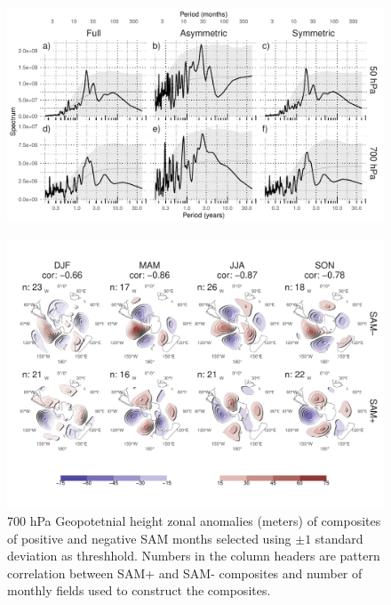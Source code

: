 \documentclass[]{ametsocV5}
\begin{document}
\begin{figure}
\includegraphics{A3-1} \label{fig:A3}
\end{figure}

\begin{figure}
\includegraphics{A9-1} \caption[700 hPa Geopotetnial height zonal anomalies (meters) of composites of positive and negative SAM months selected using $\pm1$ standard deviation as threshhold]{700 hPa Geopotetnial height zonal anomalies (meters) of composites of positive and negative SAM months selected using $\pm1$ standard deviation as threshhold. Numbers in the column headers are pattern correlation between SAM+ and SAM- composites and number of monthly fields used to construct the composites.}\label{fig:A9}
\end{figure}
\end{document}
